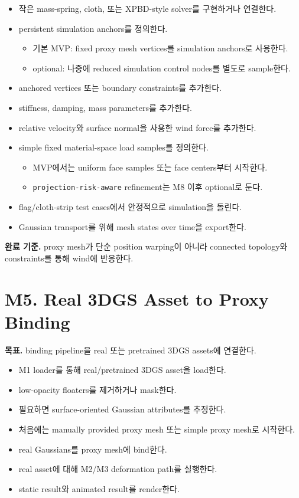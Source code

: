 \documentclass[10pt]{article}
\newcommand{\code}[1]{\texttt{#1}}
\begin{document}
\begin{itemize}
  \item 작은 mass-spring, cloth, 또는 XPBD-style solver를 구현하거나 연결한다.
  \item persistent simulation anchors를 정의한다.
    \begin{itemize}
      \item 기본 MVP: fixed proxy mesh vertices를 simulation anchors로 사용한다.
      \item optional: 나중에 reduced simulation control nodes를 별도로 sample한다.
    \end{itemize}
  \item anchored vertices 또는 boundary constraints를 추가한다.
  \item stiffness, damping, mass parameters를 추가한다.
  \item relative velocity와 surface normal을 사용한 wind force를 추가한다.
  \item simple fixed material-space load samples를 정의한다.
    \begin{itemize}
      \item MVP에서는 uniform face samples 또는 face centers부터 시작한다.
      \item \code{projection-risk-aware} refinement는 M8 이후 optional로 둔다.
    \end{itemize}
  \item flag/cloth-strip test cases에서 안정적으로 simulation을 돌린다.
  \item Gaussian transport를 위해 mesh states over time을 export한다.
\end{itemize}

\textbf{완료 기준.} proxy mesh가 단순 position warping이 아니라 connected topology와 constraints를 통해 wind에 반응한다.

\section{M5. Real 3DGS Asset to Proxy Binding}

\textbf{목표.} binding pipeline을 real 또는 pretrained 3DGS assets에 연결한다.

\begin{itemize}
  \item M1 loader를 통해 real/pretrained 3DGS asset을 load한다.
  \item low-opacity floaters를 제거하거나 mask한다.
  \item 필요하면 surface-oriented Gaussian attributes를 추정한다.
  \item 처음에는 manually provided proxy mesh 또는 simple proxy mesh로 시작한다.
  \item real Gaussians를 proxy mesh에 bind한다.
  \item real asset에 대해 M2/M3 deformation path를 실행한다.
  \item static result와 animated result를 render한다.
\end{itemize}
\end{document}
